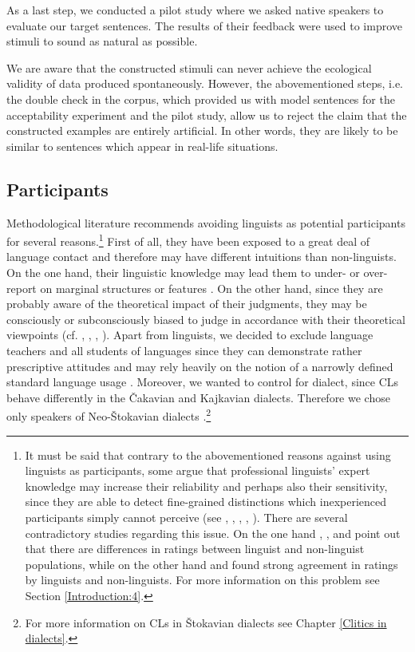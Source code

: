 As a last step, we conducted a pilot study where we asked native speakers to evaluate our target sentences. The results of their feedback were used to improve stimuli to sound as natural as possible.

We are aware that the constructed stimuli can never achieve the ecological validity of data produced spontaneously. However, the abovementioned steps, i.e. the double check in the corpus, which provided us with model sentences for the acceptability experiment and the pilot study, allow us to reject the claim that the constructed examples are entirely artificial. In other words, they are likely to be similar to sentences which appear in real-life situations.

\subsection{Participants}\label{Participants}

Methodological literature recommends avoiding linguists as potential participants for several reasons.\footnote{It must be said that contrary to the abovementioned reasons against using linguists as participants, some argue that professional linguists’ expert knowledge may increase their reliability and perhaps also their sensitivity, since they are able to detect fine-grained distinctions which inexperienced participants simply cannot perceive (see \citealt[][61, 66]{Newmeyer83}, \citealt[][397]{Newmeyer07}, \citealt[][354]{Fanselow07}, \citealt[][497--500]{Devitt06}, \citealt[][860f]{Devitt10}). There are several contradictory studies regarding this issue. On the one hand \citet[][]{Spencer73}, \citet[][]{GordonHendrick97}, and \citet[][]{Dabrowska10} point out that there are differences in ratings between linguist and non-linguist populations, while on the other hand \citet[][]{SprouseAlmeida12} and \citet[][]{SSA13} found strong agreement in ratings by linguists and non-linguists. For more information on this problem see Section \ref{Introduction:4}.} First of all, they have been exposed to a great deal of language contact and therefore may have different intuitions than non-linguists. On the one hand, their linguistic knowledge may lead them to under- or over-report on marginal structures or features \citep[cf.][78]{KrugSell13}. On the other hand, since they are probably aware of the theoretical impact of their judgments, they may be consciously or subconsciously biased to judge in accordance with their theoretical viewpoints (cf. \citealt[][372]{Ferreira05}, \citealt[][1483]{WasowArnold05}, \citealt[][233]{GibsonFedorenko10}, \citealt[][88f, 98f]{GibsonFedorenko13}). Apart from linguists, we decided to exclude language teachers and all students of languages since they can demonstrate rather prescriptive attitudes and may rely heavily on the notion of a narrowly defined standard language usage \citep[cf.][78]{KrugSell13}. Moreover, we wanted to control for dialect, since CLs behave differently in the Čakavian and Kajkavian dialects. Therefore we chose only speakers of Neo-Štokavian dialects \citep[cf.][45]{Cowart97}.\footnote{For more information on CLs in Štokavian dialects see Chapter \ref{Clitics in dialects}.}


